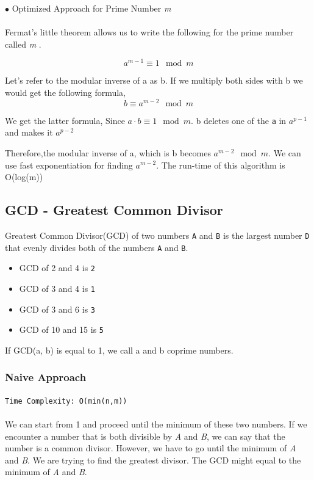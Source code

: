\documentclass[12pt]{article}
\begin{document}
$\bullet$ Optimized Approach for Prime Number \textit{m} \\\\
Fermat's little theorem allows us to write the following for the prime number called \textit{m} \cite{fermant}.

\[ a^{m-1} \equiv 1 \mod{m} \]

Let's refer to the modular inverse of a as b. If we multiply both sides with b we would get the following formula,
\[b \equiv a^{m-2} \mod{m} \]

We get the latter formula, Since $ a \cdot b \equiv 1 \mod{m} $. b deletes one of the \texttt{a} in \texttt{$a^{p-1}$} and makes it \texttt{$a^{p-2}$}

Therefore,the modular inverse of a, which is b becomes  $a^{m-2} \mod{m}$. We can use fast exponentiation for finding $a^{m-2}$. The run-time of this algorithm is O(log(m))


\clearpage

\subsection{GCD - Greatest Common Divisor}
Greatest Common Divisor(GCD) of two numbers \texttt{A} and \texttt{B} is the largest number \texttt{D} that evenly divides both of the numbers \texttt{A} and \texttt{B}. 
\begin{itemize}
  \item GCD of 2 and 4 is \texttt{2} 
  \item GCD of 3 and 4 is \texttt{1} 
  \item GCD of 3 and 6 is \texttt{3} 
  \item GCD of 10 and 15 is \texttt{5} 
\end{itemize}

If GCD(a, b) is equal to 1, we call a and b coprime numbers. 

\subsubsection{ Naive Approach }
\texttt{Time Complexity:  O(min(n,m)) } \\ \\
We can start from 1 and proceed until the minimum of these two numbers. If we encounter a number that is both divisible by \textit{A} and \textit{B}, we can say that the number is a common divisor. However, we have to go until the minimum of \textit{A} and \textit{B}. We are trying to find the greatest divisor. The GCD might equal to the minimum of \textit{A} and \textit{B}.
\end{document}
